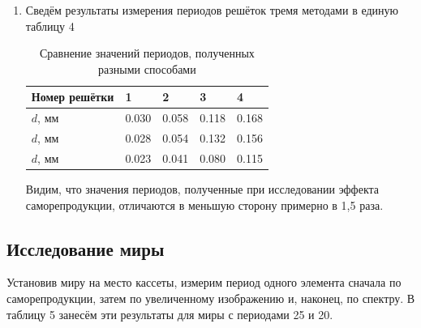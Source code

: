 \documentclass[a4paper]{article}
\begin{document}
\begin{enumerate}
\begin{table}[h]
\begin{tabular}{ |p{2.5cm}||p{0.7cm}|p{0.7cm}|p{0.7cm}|p{0.7cm}|}
 \hline
 
\end{tabular}
\end{table}

\item Сведём результаты измерения периодов решёток тремя методами в единую таблицу 4



    \begin{table}[h]
    \centering
    \begin{center}
    \caption{Сравнение значений периодов, полученных разными способами}
    \end{center}
    \vspace{0.1cm}
    \label{tab:my_label}
    \begin{tabular}{ |p{2.5cm}||p{0.7cm}|p{0.7cm}|p{0.7cm}|p{0.7cm}|}
 \hline
Номер решётки & 1 & 2 & 3 & 4\\
 \hline
 $d$, мм & 0.030 & 0.058 & 0.118 & 0.168\\
\hline
 $d$, мм & 0.028 & 0.054 & 0.132 & 0.156\\
\hline
 $d$, мм & 0.023 & 0.041 & 0.080 & 0.115\\
\hline
 
\end{tabular}
\end{table}

Видим, что значения периодов, полученные при исследовании эффекта саморепродукции, отличаются в меньшую сторону примерно в 1,5 раза.
\end{enumerate}

\subsection{Исследование миры}

Установив миру на место кассеты, измерим период одного элемента сначала по саморепродукции, затем по увеличенному изображению и, наконец, по спектру. В таблицу 5 занесём эти результаты для миры с периодами 25 и 20.
\end{document}
